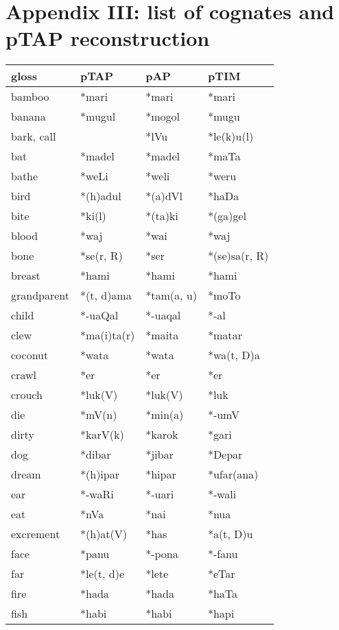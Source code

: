 \documentclass[a4paper]{article}
\begin{document}
\section[Appendix III: list of cognates and pTAP reconstruction]{Appendix III: list of cognates and pTAP reconstruction}
\begin{center}
\tablehead{}
\begin{supertabular}{m{0.9011598in}m{0.81295985in}m{0.81295985in}m{0.83515984in}}
\hline
\textbf{gloss} &
\textbf{pTAP} &
\textbf{pAP} &
\textbf{pTIM}\\\hline
bamboo &
*mari &
*mari &
*mari\\
banana &
*mugul &
*mogol &
*mugu\\
bark, call &
 &
*lVu &
*le(k)u(l)\\
bat &
*madel &
*madel &
*maTa\\
bathe &
*weLi &
*weli &
*weru\\
bird &
*(h)adul &
*(a)dVl &
*haDa\\
bite &
*ki(l) &
*(ta)ki &
*(ga)gel\\
blood &
*waj &
*wai &
*waj\\
bone &
*se(r, R) &
*ser &
*(se)sa(r, R)\\
breast &
*hami &
*hami &
*hami\\
grandparent &
*(t, d)ama &
*tam(a, u) &
*moTo\\
child &
*-uaQal &
*-uaqal &
*-al\\
clew &
*ma(i)ta(r) &
*maita &
*matar\\
coconut &
*wata &
*wata &
*wa(t, D)a\\
crawl &
*er &
*er &
*er\\
crouch &
*luk(V) &
*luk(V) &
*luk\\
die &
*mV(n) &
*min(a) &
*-umV\\
dirty &
*karV(k) &
*karok &
*gari\\
dog &
*dibar &
*jibar &
*Depar\\
dream &
*(h)ipar &
*hipar &
*ufar(ana)\\
ear &
*-waRi &
*-uari &
*-wali\\
eat &
*nVa &
*nai &
*nua\\
excrement &
*(h)at(V) &
*has &
*a(t, D)u\\
face &
*panu &
*-pona &
*-fanu\\
far &
*le(t, d)e &
*lete &
*eTar\\
fire &
*hada &
*hada &
*haTa\\
fish &
*habi &
*habi &
*hapi\\

\end{supertabular}
\end{center}
\end{document}
